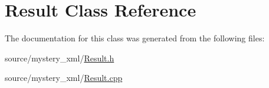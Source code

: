 \hypertarget{classResult}{
\section{Result Class Reference}
\label{classResult}
}


The documentation for this class was generated from the following files:\begin{DoxyCompactItemize}
\item 
source/mystery\_\-xml/\hyperlink{Result_8h}{Result.h}\item 
source/mystery\_\-xml/\hyperlink{Result_8cpp}{Result.cpp}\end{DoxyCompactItemize}
